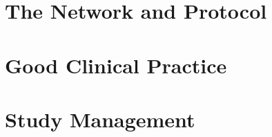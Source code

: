 \documentclass[12pt,twoside]{book}
\begin{document}
\frontmatter
\pagestyle{empty}

\pagestyle{protocol}
\dominitoc
\tableofcontents
\listoftables
\listoffigures

\mainmatter

\part{The Network and Protocol}



\part{Good Clinical Practice}


\part{Study Management}





\backmatter
{}
\footnotesize
\printindex
\normalsize
{}
\end{document}

